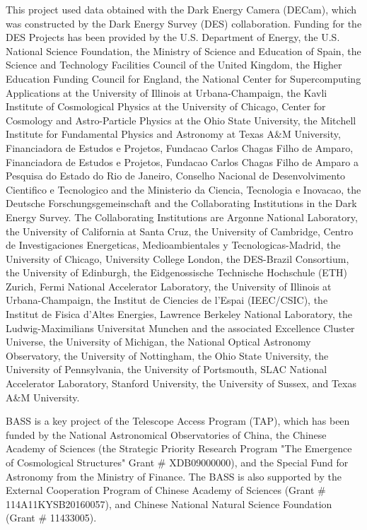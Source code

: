 \documentclass[twocolumn]{aastex62}
\begin{document}
{This project used data obtained with the Dark Energy Camera (DECam), which was constructed by the Dark Energy Survey (DES) collaboration. Funding for the DES Projects has been provided by the U.S. Department of Energy, the U.S. National Science Foundation, the Ministry of Science and Education of Spain, the Science and Technology Facilities Council of the United Kingdom, the Higher Education Funding Council for England, the National Center for Supercomputing Applications at the University of Illinois at Urbana-Champaign, the Kavli Institute of Cosmological Physics at the University of Chicago, Center for Cosmology and Astro-Particle Physics at the Ohio State University, the Mitchell Institute for Fundamental Physics and Astronomy at Texas A\&M University, Financiadora de Estudos e Projetos, Fundacao Carlos Chagas Filho de Amparo, Financiadora de Estudos e Projetos, Fundacao Carlos Chagas Filho de Amparo a Pesquisa do Estado do Rio de Janeiro, Conselho Nacional de Desenvolvimento Cientifico e Tecnologico and the Ministerio da Ciencia, Tecnologia e Inovacao, the Deutsche Forschungsgemeinschaft and the Collaborating Institutions in the Dark Energy Survey. The Collaborating Institutions are Argonne National Laboratory, the University of California at Santa Cruz, the University of Cambridge, Centro de Investigaciones Energeticas, Medioambientales y Tecnologicas-Madrid, the University of Chicago, University College London, the DES-Brazil Consortium, the University of Edinburgh, the Eidgenossische Technische Hochschule (ETH) Zurich, Fermi National Accelerator Laboratory, the University of Illinois at Urbana-Champaign, the Institut de Ciencies de l'Espai (IEEC/CSIC), the Institut de Fisica d'Altes Energies, Lawrence Berkeley National Laboratory, the Ludwig-Maximilians Universitat Munchen and the associated Excellence Cluster Universe, the University of Michigan, the National Optical Astronomy Observatory, the University of Nottingham, the Ohio State University, the University of Pennsylvania, the University of Portsmouth, SLAC National Accelerator Laboratory, Stanford University, the University of Sussex, and Texas A\&M University.

BASS is a key project of the Telescope Access Program (TAP), which has been funded by the National Astronomical Observatories of China, the Chinese Academy of Sciences (the Strategic Priority Research Program "The Emergence of Cosmological Structures" Grant \# XDB09000000), and the Special Fund for Astronomy from the Ministry of Finance. The BASS is also supported by the External Cooperation Program of Chinese Academy of Sciences (Grant \# 114A11KYSB20160057), and Chinese National Natural Science Foundation (Grant \# 11433005).

}
\end{document}
